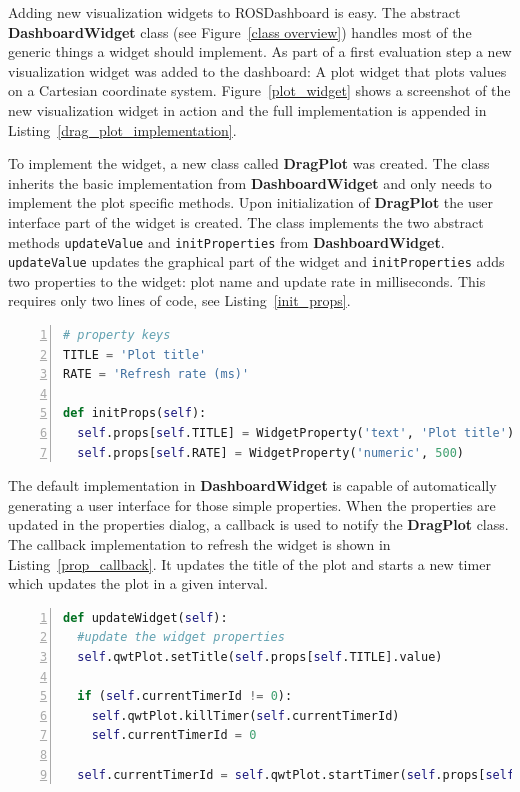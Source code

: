 Adding new visualization widgets to ROSDashboard is easy. The abstract \textbf{DashboardWidget} class (see Figure~\ref{class overview}) handles most of the generic things a widget should implement. As part of a first evaluation step a new visualization widget was added to the dashboard: A plot widget that plots values on a Cartesian coordinate system. Figure~\ref{plot_widget} shows a screenshot of the new visualization widget in action and the full implementation is appended in Listing~\ref{drag_plot_implementation}.

To implement the widget, a new class called \textbf{DragPlot} was created. The class inherits the basic implementation from \textbf{DashboardWidget} and only needs to implement the plot specific methods. Upon initialization of \textbf{DragPlot} the user interface part of the widget is created. The class implements the two abstract methods \verb+updateValue+ and \verb+initProperties+ from \textbf{DashboardWidget}. \verb+updateValue+ updates the graphical part of the widget and \verb+initProperties+ adds two properties to the widget: plot name and update rate in milliseconds. This requires only two lines of code, see Listing~\ref{init_props}.

\begin{lstlisting}[frame=single,caption={Implementation of initProperties in DragPlot.},label=init_props,language=Python,numbers=left,breaklines=true]
# property keys
TITLE = 'Plot title'
RATE = 'Refresh rate (ms)'

def initProps(self):
  self.props[self.TITLE] = WidgetProperty('text', 'Plot title')
  self.props[self.RATE] = WidgetProperty('numeric', 500)
\end{lstlisting}

The default implementation in \textbf{DashboardWidget} is capable of automatically generating a user interface for those simple properties. When the properties are updated in the properties dialog, a callback is used to notify the \textbf{DragPlot} class. The callback implementation to refresh the widget is shown in Listing~\ref{prop_callback}. It updates the title of the plot and starts a new timer which updates the plot in a given interval.

\begin{lstlisting}[frame=single,caption={Implemented callback in DragPlot.},label=prop_callback,language=Python,numbers=left,breaklines=true]
def updateWidget(self):
  #update the widget properties
  self.qwtPlot.setTitle(self.props[self.TITLE].value)

  if (self.currentTimerId != 0):
    self.qwtPlot.killTimer(self.currentTimerId)
    self.currentTimerId = 0

  self.currentTimerId = self.qwtPlot.startTimer(self.props[self.RATE].value)
\end{lstlisting}

